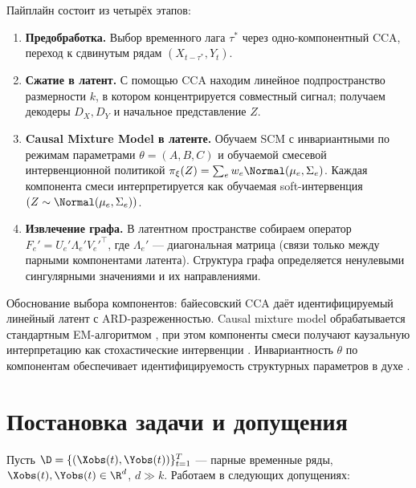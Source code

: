 \documentclass[a4paper,14pt]{article}
\theoremstyle{plain} %
\theoremstyle{definition} %
\theoremstyle{remark} %
\begin{document}
Пайплайн состоит из четырёх этапов:
\begin{enumerate}
    \item \textbf{Предобработка.} Выбор временного лага $\tau^*$ через одно-компонентный CCA, переход к сдвинутым рядам $(X_{t-\tau^*}, Y_t)$.
    \item \textbf{Сжатие в латент.} С помощью CCA находим линейное подпространство размерности $k$, в котором концентрируется совместный сигнал; получаем декодеры $D_X, D_Y$ и начальное представление $Z$.
    \item \textbf{Causal Mixture Model в латенте.} Обучаем SCM с инвариантными по режимам параметрами $\theta = (A, B, C)$ и обучаемой смесевой интервенционной политикой
    $\pi_\xi(Z) = \sum_e w_e \Normal(\mu_e, \Sigma_e)$. Каждая компонента смеси интерпретируется как обучаемая soft-интервенция $\do(Z \sim \Normal(\mu_e, \Sigma_e))$.
    \item \textbf{Извлечение графа.} В латентном пространстве собираем оператор $F_e' = U_e' \Lambda_e' V_e'^\top$, где $\Lambda_e'$ --- диагональная матрица (связи только между парными компонентами латента). Структура графа определяется ненулевыми сингулярными значениями и их направлениями.
\end{enumerate}

Обоснование выбора компонентов: байесовский CCA \cite{klami2013bayesian} даёт идентифицируемый линейный латент с ARD-разреженностью. Causal mixture model \cite{mclachlan2000finite} обрабатывается стандартным EM-алгоритмом \cite{dempster1977em}, при этом компоненты смеси получают каузальную интерпретацию как стохастические интервенции \cite{correa2020calculus}. Инвариантность $\theta$ по компонентам обеспечивает идентифицируемость структурных параметров в духе \cite{khemakhem2020variational}.

\section{Постановка задачи и допущения}

Пусть $\D = \{(\Xobs(t), \Yobs(t))\}_{t=1}^{T}$ --- парные временные ряды, $\Xobs(t), \Yobs(t) \in \R^d$, $d \gg k$. Работаем в следующих допущениях:
\end{document}
